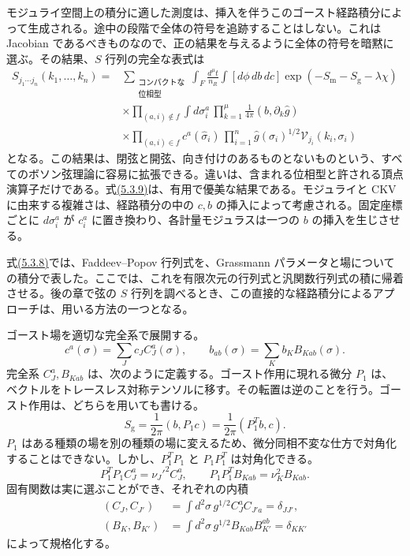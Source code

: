 モジュライ空間上の積分に適した測度は、挿入を伴うこのゴースト経路積分によって生成される。途中の段階で全体の符号を追跡することはしない。これは Jacobian であるべきものなので、正の結果を与えるように全体の符号を暗黙に選ぶ。その結果、$S$ 行列の完全な表式は
\begin{equation}
\begin{aligned}
S_{j_1\cdots j_n}(k_1,\ldots,k_n)
={}&\sum_{\substack{\text{コンパクトな}\\\text{位相型}}}
\int_F\frac{d^\mu t}{n_R}
\int[d\phi\,db\,dc]\exp(-S_{\mathrm m}-S_{\mathrm g}-\lambda\chi)\\
&\times\prod_{(a,i)\notin f}\int d\sigma_i^a\,
\prod_{k=1}^{\mu}\frac1{4\pi}(b,\partial_k\hat g)\\
&\times\prod_{(a,i)\in f}c^a(\hat\sigma_i)\,
\prod_{i=1}^n\hat g(\sigma_i)^{1/2}\mathcal V_{j_i}(k_i,\sigma_i)
\end{aligned}
\tag{5.3.9}\label{eq:5.3.9}
\end{equation}
となる。この結果は、閉弦と開弦、向き付けのあるものとないものという、すべてのボソン弦理論に容易に拡張できる。違いは、含まれる位相型と許される頂点演算子だけである。式\hyperref[eq:5.3.9]{(5.3.9)}は、有用で優美な結果である。モジュライと CKV に由来する複雑さは、経路積分の中の $c,b$ の挿入によって考慮される。固定座標ごとに $d\sigma_i^a$ が $c_i^a$ に置き換わり、各計量モジュラスは一つの $b$ の挿入を生じさせる。


式\hyperref[eq:5.3.8]{(5.3.8)}では、Faddeev--Popov 行列式を、Grassmann パラメータと場についての積分で表した。ここでは、これを有限次元の行列式と汎関数行列式の積に帰着させる。後の章で弦の $S$ 行列を調べるとき、この直接的な経路積分によるアプローチは、用いる方法の一つとなる。

ゴースト場を適切な完全系で展開する。
\begin{equation}
c^a(\sigma)=\sum_Jc_JC_J^a(\sigma),\qquad
b_{ab}(\sigma)=\sum_Kb_KB_{Kab}(\sigma).
\tag{5.3.10}\label{eq:5.3.10}
\end{equation}
完全系 $C_J^a,B_{Kab}$ は、次のように定義する。ゴースト作用に現れる微分 $P_1$ は、ベクトルをトレースレス対称テンソルに移す。その転置は逆のことを行う。ゴースト作用は、どちらを用いても書ける。
\begin{equation}
S_{\mathrm g}=\frac1{2\pi}(b,P_1c)
=\frac1{2\pi}(P_1^Tb,c).
\tag{5.3.11}\label{eq:5.3.11}
\end{equation}
$P_1$ はある種類の場を別の種類の場に変えるため、微分同相不変な仕方で対角化することはできない。しかし、$P_1^TP_1$ と $P_1P_1^T$ は対角化できる。
\begin{equation}
P_1^TP_1C_J^a=\nu_J'^2C_J^a,\qquad
P_1P_1^TB_{Kab}=\nu_K^2B_{Kab}.
\tag{5.3.12}\label{eq:5.3.12}
\end{equation}
固有関数は実に選ぶことができ、それぞれの内積
\begin{align}
(C_J,C_{J'})
&=\int d^2\sigma\,g^{1/2}C_J^aC_{J'a}
=\delta_{JJ'},
\tag{5.3.13a}\label{eq:5.3.13a}\\
(B_K,B_{K'})
&=\int d^2\sigma\,g^{1/2}B_{Kab}B_{K'}^{ab}
=\delta_{KK'}
\tag{5.3.13b}\label{eq:5.3.13b}
\end{align}
によって規格化する。

